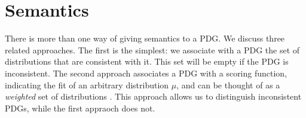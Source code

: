 \documentclass{article}
\theoremstyle{plain}
\theoremstyle{definition}
\theoremstyle{remark}
\newcommand{\modelname}{probabilistic dependency graph}
\newcommand{\modelnames}{\modelname s}
\newcommand{\MN}{PDG}
\newcommand{\MNs}{\MN s}
\numberwithin{equation}{section}
\begin{document}
	\section{Semantics}\label{sec:semantics}
	There is more than one way of giving semantics to a \MN.  We discuss three related approaches.
	The first is the simplest: we associate with a PDG the set of distributions that are consistent with it. This set will be empty if the PDG is inconsistent.
	The second approach associates a PDG with a scoring function,
        indicating the fit of an arbitrary distribution $\mu$, and can
        be thought of as a \emph{weighted} set of distributions
	\cite[cf.][]{halpern2015weighted}.
This approach allows us to distinguish inconsistent PDGs, while the first
appraoch does not.        
\end{document}
